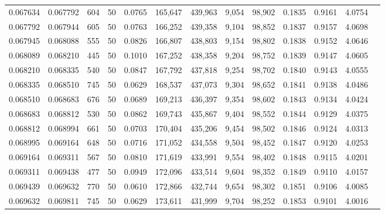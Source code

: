 \begin{tabular}{rrrrrrrrrrrrr}
0.067634 & 0.067792 &   604 &  50 &                                     0.0765 & 165,647 & 439,963 &   9,054 &  98,902 & 0.1835 & 0.9161 & 4.0754 \\
0.067792 & 0.067944 &   605 &  50 &                                     0.0763 & 166,252 & 439,358 &   9,104 &  98,852 & 0.1837 & 0.9157 & 4.0698 \\
0.067945 & 0.068088 &   555 &  50 &                                     0.0826 & 166,807 & 438,803 &   9,154 &  98,802 & 0.1838 & 0.9152 & 4.0646 \\
0.068089 & 0.068210 &   445 &  50 &                                     0.1010 & 167,252 & 438,358 &   9,204 &  98,752 & 0.1839 & 0.9147 & 4.0605 \\
0.068210 & 0.068335 &   540 &  50 &                                     0.0847 & 167,792 & 437,818 &   9,254 &  98,702 & 0.1840 & 0.9143 & 4.0555 \\
0.068335 & 0.068510 &   745 &  50 &                                     0.0629 & 168,537 & 437,073 &   9,304 &  98,652 & 0.1841 & 0.9138 & 4.0486 \\
0.068510 & 0.068683 &   676 &  50 &                                     0.0689 & 169,213 & 436,397 &   9,354 &  98,602 & 0.1843 & 0.9134 & 4.0424 \\
0.068683 & 0.068812 &   530 &  50 &                                     0.0862 & 169,743 & 435,867 &   9,404 &  98,552 & 0.1844 & 0.9129 & 4.0375 \\
0.068812 & 0.068994 &   661 &  50 &                                     0.0703 & 170,404 & 435,206 &   9,454 &  98,502 & 0.1846 & 0.9124 & 4.0313 \\
0.068995 & 0.069164 &   648 &  50 &                                     0.0716 & 171,052 & 434,558 &   9,504 &  98,452 & 0.1847 & 0.9120 & 4.0253 \\
0.069164 & 0.069311 &   567 &  50 &                                     0.0810 & 171,619 & 433,991 &   9,554 &  98,402 & 0.1848 & 0.9115 & 4.0201 \\
0.069311 & 0.069438 &   477 &  50 &                                     0.0949 & 172,096 & 433,514 &   9,604 &  98,352 & 0.1849 & 0.9110 & 4.0157 \\
0.069439 & 0.069632 &   770 &  50 &                                     0.0610 & 172,866 & 432,744 &   9,654 &  98,302 & 0.1851 & 0.9106 & 4.0085 \\
0.069632 & 0.069811 &   745 &  50 &                                     0.0629 & 173,611 & 431,999 &   9,704 &  98,252 & 0.1853 & 0.9101 & 4.0016 \\

\end{tabular}
